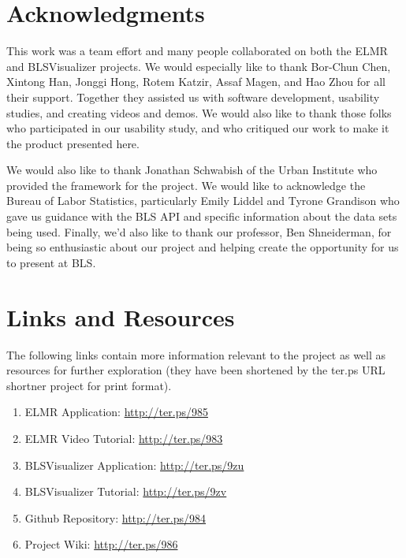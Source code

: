\documentclass[11pt,letterpaper]{article}
\begin{document}
\section{Acknowledgments}

This work was a team effort and many people collaborated on both the ELMR and BLSVisualizer projects. We would especially like to thank Bor-Chun Chen, Xintong Han, Jonggi Hong, Rotem Katzir, Assaf Magen, and Hao Zhou for all their support. Together they assisted us with software development, usability studies, and creating videos and demos. We would also like to thank those folks who participated in our usability study, and who critiqued our work to make it the product presented here.

We would also like to thank Jonathan Schwabish of the Urban Institute who provided the framework for the project. We would like to acknowledge the Bureau of Labor Statistics, particularly Emily Liddel and Tyrone Grandison who gave us guidance with the BLS API and specific information about the data sets being used. Finally, we'd also like to thank our professor, Ben Shneiderman, for being so enthusiastic about our project and helping create the opportunity for us to present at BLS.

\section{Links and Resources}

The following links contain more information relevant to the project as well as resources for further exploration (they have been shortened by the ter.ps URL shortner project for print format).

\begin{enumerate}
    \item ELMR Application: \url{http://ter.ps/985}
    \item ELMR Video Tutorial: \url{http://ter.ps/983}
    \item BLSVisualizer Application: \url{http://ter.ps/9zu}
    \item BLSVisualizer Tutorial: \url{http://ter.ps/9zv}
    \item Github Repository: \url{http://ter.ps/984}
    \item Project Wiki: \url{http://ter.ps/986}
\end{enumerate}




\end{document}
